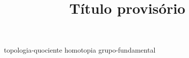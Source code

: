 \documentclass{article}
\title{Título provisório}
\theoremstyle{definition}
\theoremstyle{plain}
\theoremstyle{remark}
\begin{document}
\maketitle
{topologia-quociente}
{homotopia}
{grupo-fundamental}
\end{document}
